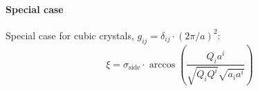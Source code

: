 \paragraph*{Special case}
Special case for cubic crystals, $g_{ij} = \delta_{ij} \cdot \left( 2\pi / a \right)^2$:
\begin{equation}
	\xi = \sigma_{\mathrm{side}} \cdot \arccos \left( \frac{ Q_i a^i }{ \sqrt{Q_i Q^i} \sqrt{a_i a^i} } \right) 
\end{equation}
